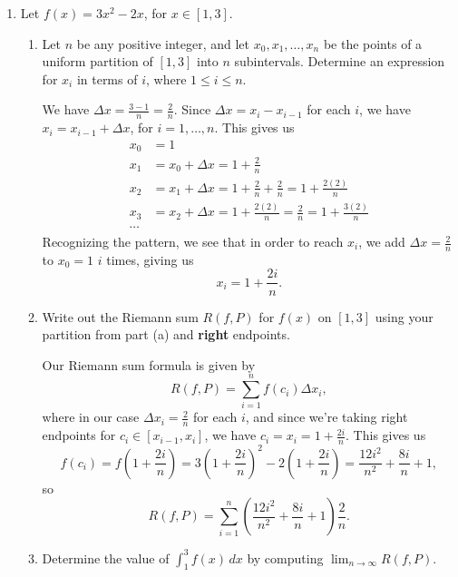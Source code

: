 \documentclass[letterpaper,12pt]{article}
\begin{document}
\begin{enumerate}
\bigskip

\item Let $f(x) = 3x^2-2x$, for $x\in [1,3]$.
\begin{enumerate}
\item Let $n$ be any positive integer, and let $x_0, x_1, \ldots, x_n$ be the points of a uniform partition of $[1,3]$ into $n$ subintervals. Determine an expression for $x_i$ in terms of $i$, where $1\leq i\leq n$.

\medskip

We have $\Delta x = \frac{3-1}{n} = \frac{2}{n}$. Since $\Delta x = x_i-x_{i-1}$ for each $i$, we have $x_i = x_{i-1}+\Delta x$, for $i=1,\ldots, n$. This gives us
\begin{align*}
x_0 & = 1\\
x_1 & = x_0+\Delta x = 1+\frac{2}{n}\\
x_2 & = x_1+\Delta x = 1+\frac{2}{n}+\frac{2}{n} = 1+\frac{2(2)}{n}\\
x_3 & = x_2+\Delta x = 1+\frac{2(2)}{n}=\frac{2}{n} = 1+\frac{3(2)}{n}\\
\cdots
\end{align*}
Recognizing the pattern, we see that in order to reach $x_i$, we add $\Delta x = \frac{2}{n}$ to $x_0=1$ $i$ times, giving us
\[
x_i = 1+\frac{2i}{n}.
\]

\medskip

\item Write out the Riemann sum $R(f,P)$ for $f(x)$ on $[1,3]$ using your partition from part (a) and \textbf{right} endpoints.

\medskip

Our Riemann sum formula is given by
\[
R(f,P) = \sum_{i=1}^n f(c_i)\Delta x_i,
\]
where in our case $\Delta x_i = \frac{2}{n}$ for each $i$, and since we're taking right endpoints for $c_i\in [x_{i-1},x_i]$, we have $c_i = x_i = 1+\frac{2i}{n}$. This gives us
\[
f(c_i) = f\left(1+\frac{2i}{n}\right) = 3\left(1+\frac{2i}{n}\right)^2-2\left(1+\frac{2i}{n}\right) = \frac{12i^2}{n^2}+\frac{8i}{n}+1,
\]
so
\[
R(f,P) = \sum_{i=1}^n \left(\frac{12i^2}{n^2}+\frac{8i}{n}+1\right)\frac{2}{n}.
\]

\medskip

\item Determine the value of $\int_1^3f(x)\,dx$ by computing 
$\lim_{n\to\infty}R(f,P).$

\medskip


\end{enumerate}
\end{enumerate}
\end{document}
